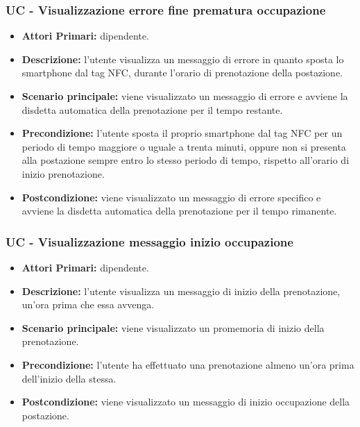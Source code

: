 \subsubsection{ UC - Visualizzazione errore fine prematura occupazione}
\begin{itemize}
	\item\textbf{Attori Primari:} dipendente.
	\item\textbf{Descrizione:} l’utente visualizza un messaggio di errore in quanto sposta lo smartphone dal tag NFC, durante l'orario di prenotazione della postazione.
	\item\textbf{Scenario principale:} viene visualizzato un messaggio di errore e avviene la disdetta automatica della prenotazione per il tempo restante.
	\item\textbf{Precondizione:} l’utente sposta il proprio smartphone dal tag NFC per un periodo di tempo maggiore o uguale a trenta minuti, oppure non si presenta alla postazione sempre entro lo stesso periodo di tempo, rispetto all'orario di inizio prenotazione. 
	\item\textbf{Postcondizione:} viene visualizzato un messaggio di errore specifico e avviene la disdetta automatica della prenotazione per il tempo rimanente.
\end{itemize}

\subsubsection{ UC - Visualizzazione messaggio inizio occupazione}
\begin{itemize}
	\item\textbf{Attori Primari:} dipendente.
	\item\textbf{Descrizione:} l’utente visualizza un messaggio di inizio della prenotazione, un'ora prima che essa avvenga.
	\item\textbf{Scenario principale:} viene visualizzato un promemoria di inizio della prenotazione.
	\item\textbf{Precondizione:} l’utente ha effettuato una prenotazione almeno un'ora prima dell'inizio della stessa.
	\item\textbf{Postcondizione:} viene visualizzato un messaggio di inizio occupazione della postazione.
\end{itemize}

